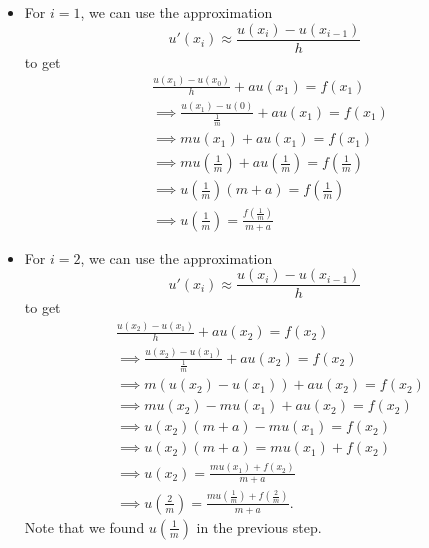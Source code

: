 \documentclass[letterpaper]{article}
\newcommand{\0}{\mathbf{0}}
\begin{document}
\begin{enumerate}
\begin{itemize}
        \item For $i = 1$, we can use the approximation 
        \[u'(x_i) \approx \frac{u(x_i) - u(x_{i - 1})}{h}\]
        to get 
        \begin{equation*}
            \begin{aligned}
                &\frac{u(x_1) - u(x_0)}{h} + au(x_1) = f(x_1) \\ 
                    &\implies \frac{u(x_1) - u(0)}{\frac{1}{m}} + au(x_1) = f(x_1) \\ 
                    &\implies mu(x_1) + au(x_1) = f(x_1) \\ 
                    &\implies mu\left(\frac{1}{m}\right) + au\left(\frac{1}{m}\right) = f\left(\frac{1}{m}\right) \\ 
                    &\implies u\left(\frac{1}{m}\right) (m + a) = f\left(\frac{1}{m}\right) \\ 
                    &\implies u\left(\frac{1}{m}\right) = \frac{f\left(\frac{1}{m}\right)}{m + a}
            \end{aligned}
        \end{equation*}

        \item For $i = 2$, we can use the approximation
        \[u'(x_i) \approx \frac{u(x_i) - u(x_{i - 1})}{h}\]
        to get 
        \begin{equation*}
            \begin{aligned}
                &\frac{u(x_2) - u(x_1)}{h} + au(x_2) = f(x_2) \\ 
                    &\implies \frac{u(x_2) - u(x_1)}{\frac{1}{m}} + au(x_2) = f(x_2) \\ 
                    &\implies m\left(u(x_2) - u(x_1)\right) + au(x_2) = f(x_2) \\ 
                    &\implies mu(x_2) - mu(x_1) + au(x_2) = f(x_2) \\ 
                    &\implies u(x_2)(m + a) - mu(x_1) = f(x_2) \\ 
                    &\implies u(x_2)(m + a) = mu(x_1) + f(x_2) \\ 
                    &\implies u(x_2) = \frac{mu(x_1) + f(x_2)}{m + a} \\ 
                    &\implies u\left(\frac{2}{m}\right) = \frac{mu\left(\frac{1}{m}\right) + f\left(\frac{2}{m}\right)}{m + a}.
            \end{aligned}
        \end{equation*}
        Note that we found $u\left(\frac{1}{m}\right)$ in the previous step.


\end{itemize}
\end{enumerate}
\end{document}
